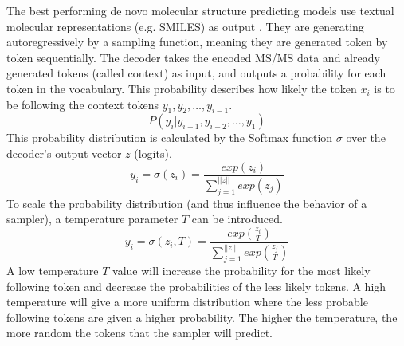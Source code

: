 The best performing de novo molecular structure predicting models use textual molecular representations (e.g. SMILES) as output \cite{litsa2021spec2mol, shrivastava2021massgenie, butler2023ms2mol}.
They are generating autoregressively by a sampling function, meaning they are generated token by token sequentially. The decoder takes the encoded \ac{MS/MS} data and already generated tokens (called context) as input, and outputs a probability for each token in the vocabulary. This probability describes how likely the token $x_i$ is to be following the context tokens $y_{1}, y_{2}, \dots, y_{i-1}$. 
\[P(y_i | y_{i-1},y_{i-2},\dots,y_{1})\]
This probability distribution is calculated by the Softmax function $\sigma$ \cite{nwankpa2018activation} over the decoder's output vector $z$ (logits).
\[y_i = \sigma(z_i) = \frac{exp(z_i)}{\sum\limits_{j=1}^{||z||} exp(z_j)}\]
To scale the probability distribution (and thus influence the behavior of a sampler), a temperature parameter $T$ can be introduced. 
\[y_i = \sigma(z_i, T) = \frac{exp(\frac{z_i}{T})}{\sum\limits_{j=1}^{||z||} exp(\frac{z_j}{T})}\]
A low temperature $T$ value will increase the probability for the most likely following token and decrease the probabilities of the less likely tokens. A high temperature will give a more uniform distribution where the less probable following tokens are given a higher probability. The higher the temperature, the more random the tokens that the sampler will predict. 

